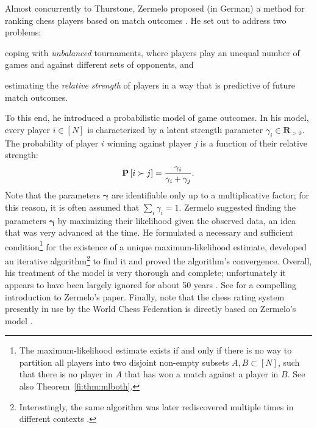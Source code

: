 Almost concurrently to Thurstone, Zermelo proposed (in German) a method for ranking chess players based on match outcomes \citep{zermelo1928berechnung}.
He set out to address two problems:
\begin{enuminline}
\item coping with \emph{unbalanced} tournaments, where players play an unequal number of games and against different sets of opponents, and
\item estimating the \emph{relative strength} of players in a way that is predictive of future match outcomes.
\end{enuminline}
To this end, he introduced a probabilistic model of game outcomes.
In his model, every player $i \in [N]$ is characterized by a latent strength parameter $\gamma_i \in \mathbf{R}_{>0}$.
The probability of player $i$ winning against player $j$ is a function of their relative strength:
\begin{align}
\label{in:eq:zermelo}
\mathbf{P}\left[ i \succ j \right] = \frac{\gamma_i}{\gamma_i + \gamma_j}.
\end{align}
Note that the parameters $\bm{\gamma}$ are identifiable only up to a multiplicative factor;
for this reason, it is often assumed that $\sum_i \gamma_i = 1$.
Zermelo suggested finding the parameters $\bm{\gamma}$ by maximizing their likelihood given the observed data, an idea that was very advanced at the time.
He formulated a necessary and sufficient condition\footnote{%
The maximum-likelihood estimate exists if and only if there is no way to partition all players into two disjoint non-empty subsets $A, B \subset [N]$, such that there is no player in $A$ that has won a match against a player in $B$.
See also Theorem~\ref{fi:thm:mlboth}.}
for the existence of a unique maximum-likelihood estimate, developed an iterative algorithm\footnote{%
Interestingly, the same algorithm was later rediscovered multiple times in different contexts \citep{bradley1952rank, ford1957solution, dykstra1960rank, hastie1998classification, hunter2004mm, caron2012efficient}.}
to find it and proved the algorithm's convergence.
Overall, his treatment of the model is very thorough and complete; unfortunately it appears to have been largely ignored for about 50 years \citep{david1988method}.
See \citet{glickman2013introductory} for a compelling introduction to Zermelo's paper.
Finally, note that the chess rating system presently in use by the World Chess Federation is directly based on Zermelo's model \citep{elo1978rating}.

